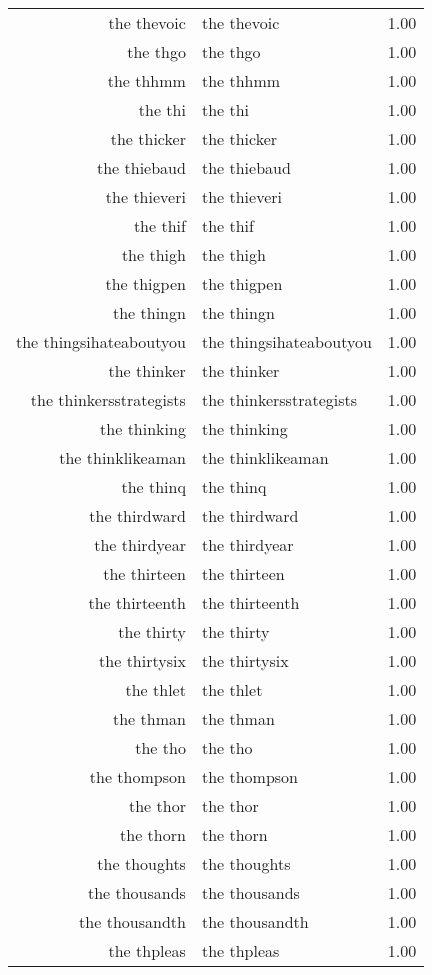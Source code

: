 \begin{table}[ht]
\begin{tabular}{rlr}
  the thevoic & the thevoic & 1.00 \\ 
  the thgo & the thgo & 1.00 \\ 
  the thhmm & the thhmm & 1.00 \\ 
  the thi & the thi & 1.00 \\ 
  the thicker & the thicker & 1.00 \\ 
  the thiebaud & the thiebaud & 1.00 \\ 
  the thieveri & the thieveri & 1.00 \\ 
  the thif & the thif & 1.00 \\ 
  the thigh & the thigh & 1.00 \\ 
  the thigpen & the thigpen & 1.00 \\ 
  the thingn & the thingn & 1.00 \\ 
  the thingsihateaboutyou & the thingsihateaboutyou & 1.00 \\ 
  the thinker & the thinker & 1.00 \\ 
  the thinkersstrategists & the thinkersstrategists & 1.00 \\ 
  the thinking & the thinking & 1.00 \\ 
  the thinklikeaman & the thinklikeaman & 1.00 \\ 
  the thinq & the thinq & 1.00 \\ 
  the thirdward & the thirdward & 1.00 \\ 
  the thirdyear & the thirdyear & 1.00 \\ 
  the thirteen & the thirteen & 1.00 \\ 
  the thirteenth & the thirteenth & 1.00 \\ 
  the thirty & the thirty & 1.00 \\ 
  the thirtysix & the thirtysix & 1.00 \\ 
  the thlet & the thlet & 1.00 \\ 
  the thman & the thman & 1.00 \\ 
  the tho & the tho & 1.00 \\ 
  the thompson & the thompson & 1.00 \\ 
  the thor & the thor & 1.00 \\ 
  the thorn & the thorn & 1.00 \\ 
  the thoughts & the thoughts & 1.00 \\ 
  the thousands & the thousands & 1.00 \\ 
  the thousandth & the thousandth & 1.00 \\ 
  the thpleas & the thpleas & 1.00 \\ 

\end{tabular}
\end{table}
